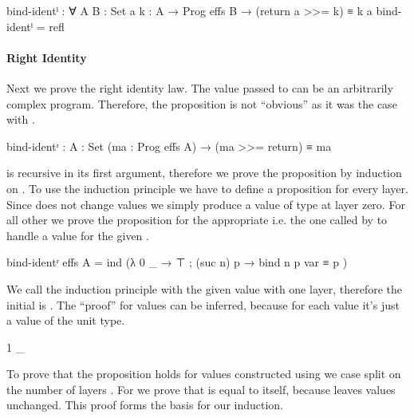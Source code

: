 \begin{code}
bind-identˡ : ∀ {A B : Set} {a} {k : A → Prog effs B} →
  (return a >>= k) ≡ k a
bind-identˡ = refl
\end{code}

\paragraph{Right Identity}
Next we prove the right identity law.
The value passed to \AgdaFunction{>>=} can be an
arbitrarily complex program.
Therefore, the proposition is not ``obvious'' as it was the case with
.

\begin{AgdaAlign}
\begin{code}
bind-identʳ : {A : Set} (ma : Prog effs A) → (ma >>= return) ≡ ma
\end{code}
\AgdaFunction{>>=} is recursive in its first argument, therefore we prove the
proposition by induction on .
To use the induction principle we have to define a proposition for every layer.
Since \AgdaFunction{>>=} does not change values we simply produce a value of
type  at layer zero.
For all other we prove the proposition for the appropriate
 i.e. the one called by  to handle a value
for the given .

\begin{code}
bind-identʳ {effs} {A} = ind (λ{ 0 _ → ⊤ ; (suc n) p → bind n p var ≡ p })
\end{code}
We call the induction principle with the given value with one layer, therefore
the initial  is .
The ``proof'' for values can be inferred, because for each value it's just a
value of the unit type.

\begin{code}
  1 _
\end{code}
To prove that the proposition holds for values constructed using
 we case split on the number of layers
.
For  we prove that
\AgdaSpace{} is equal to itself,
because \AgdaFunction{>>=} leaves values unchanged.
This proof forms the basis for our induction.


\end{AgdaAlign}
